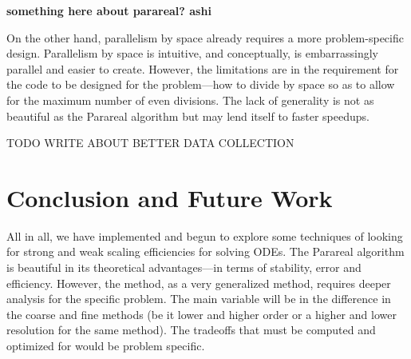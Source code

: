 \documentclass[letterpaper,12pt]{article}
\begin{document}
\textbf{something here about parareal? ashi}

On the other hand, parallelism by space already requires a more problem-specific
design. Parallelism by space is intuitive, and conceptually, is embarrassingly parallel and easier to create. However, the
limitations are in the requirement for the code to be designed for the
problem---how to divide by space so as to allow for the maximum number of even
divisions. The lack of generality is not as beautiful as the Parareal algorithm
but may lend itself to faster speedups.

TODO WRITE ABOUT BETTER DATA COLLECTION

\section{Conclusion and Future Work}

All in all, we have implemented and begun to explore some techniques of looking
for strong and weak scaling efficiencies for solving ODEs. The Parareal
algorithm is beautiful in its theoretical advantages---in terms of stability,
error and efficiency. However, the method, as a very generalized method,
requires deeper analysis for the specific problem. The main variable will be in
the difference in the coarse and fine methods (be it lower and higher order or a
higher and lower resolution for the same method). The tradeoffs that must be
computed and optimized for would be problem specific.

\nocite{*}


\end{document}
